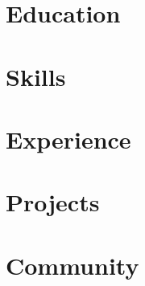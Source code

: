 \documentclass[letterpaper,11pt]{article}
\begin{document}


\section{Education}


\section{Skills}


\section{Experience}



\section{Projects}



\section{Community}

\end{document}
